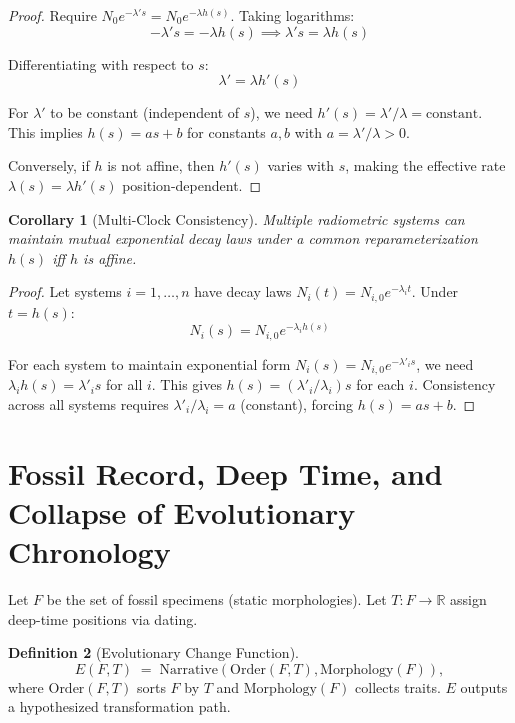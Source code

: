 \documentclass[11pt]{article}
\theoremstyle{definition}
\newtheorem{definition}{Definition}[section]
\theoremstyle{plain}
\newtheorem{corollary}[definition]{Corollary}
\theoremstyle{remark}
\begin{document}
\begin{proof}
Require $N_0 e^{-\lambda' s}=N_0 e^{-\lambda h(s)}$. Taking logarithms:
$$-\lambda' s = -\lambda h(s) \implies \lambda' s = \lambda h(s)$$

Differentiating with respect to $s$:
$$\lambda' = \lambda h'(s)$$

For $\lambda'$ to be constant (independent of $s$), we need $h'(s) = \lambda'/\lambda = \text{constant}$. This implies $h(s) = as + b$ for constants $a, b$ with $a = \lambda'/\lambda > 0$.

Conversely, if $h$ is not affine, then $h'(s)$ varies with $s$, making the effective rate $\lambda(s) = \lambda h'(s)$ position-dependent.
\end{proof}

\begin{corollary}[Multi-Clock Consistency]
Multiple radiometric systems can maintain mutual exponential decay laws under a common reparameterization $h(s)$ iff $h$ is affine.
\end{corollary}

\begin{proof}
Let systems $i = 1, \ldots, n$ have decay laws $N_i(t) = N_{i,0} e^{-\lambda_i t}$. Under $t = h(s)$:
$$N_i(s) = N_{i,0} e^{-\lambda_i h(s)}$$

For each system to maintain exponential form $N_i(s) = N_{i,0} e^{-\lambda'_i s}$, we need $\lambda_i h(s) = \lambda'_i s$ for all $i$. This gives $h(s) = (\lambda'_i/\lambda_i) s$ for each $i$. Consistency across all systems requires $\lambda'_i/\lambda_i = a$ (constant), forcing $h(s) = as + b$.
\end{proof}

\section{Fossil Record, Deep Time, and Collapse of Evolutionary Chronology}
Let $F$ be the set of fossil specimens (static morphologies). Let $T:F\to\mathbb{R}$ assign deep-time positions via dating.

\begin{definition}[Evolutionary Change Function]
\[
E(F,T) \;=\; \text{Narrative}(\text{Order}(F,T), \text{Morphology}(F)),
\]
where $\text{Order}(F,T)$ sorts $F$ by $T$ and $\text{Morphology}(F)$ collects traits. $E$ outputs a hypothesized transformation path.
\end{definition}
\end{document}
